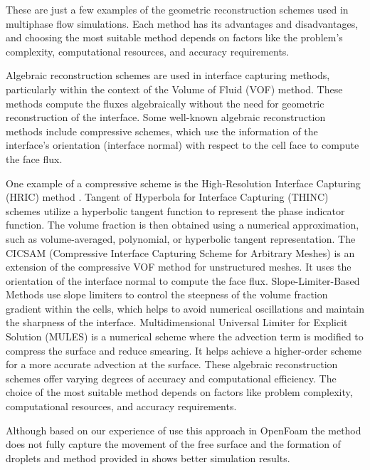 These are just a few examples of the geometric reconstruction schemes used in multiphase flow simulations. Each method has its advantages and disadvantages, and choosing the most suitable method depends on factors like the problem's complexity, computational resources, and accuracy requirements.

Algebraic reconstruction schemes are used in interface capturing methods, particularly within the context of the Volume of Fluid (VOF) method. These methods compute the fluxes algebraically without the need for geometric reconstruction of the interface. Some well-known algebraic reconstruction methods include compressive schemes, which use the information of the interface's orientation (interface normal) with respect to the cell face to compute the face flux. 

One example of a compressive scheme is the High-Resolution Interface Capturing (HRIC) method \cite{HIRC}. Tangent of Hyperbola for Interface Capturing (THINC) \cite{THINC} schemes utilize a hyperbolic tangent function to represent the phase indicator function. The volume fraction is then obtained using a numerical approximation, such as volume-averaged, polynomial, or hyperbolic tangent representation. The CICSAM (Compressive Interface Capturing Scheme for Arbitrary Meshes)\cite{CICSAM} is an extension of the compressive VOF method for unstructured meshes. It uses the orientation of the interface normal to compute the face flux. Slope-Limiter-Based Methods \cite{liu2021new} use slope limiters to control the steepness of the volume fraction gradient within the cells, which helps to avoid numerical oscillations and maintain the sharpness of the interface. Multidimensional Universal Limiter for Explicit Solution (MULES)\cite{MULES} is a numerical scheme where the advection term is modified to compress the surface and reduce smearing. It helps achieve a higher-order scheme for a more accurate advection at the surface. These algebraic reconstruction schemes offer varying degrees of accuracy and computational efficiency. The choice of the most suitable method depends on factors like problem complexity, computational resources, and accuracy requirements. 

Although based on our experience of use this approach in OpenFoam \cite{MULES} the method does not fully capture the movement of the free surface and the formation of droplets and method provided in \cite{roenby2019isoadvector} shows better simulation results.

